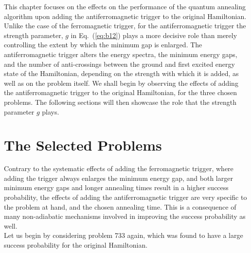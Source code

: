 \documentclass[../main.tex]{subfiles}
\begin{document}
This chapter focuses on the effects on the performance of the quantum annealing algorithm upon adding the antiferromagnetic trigger to the original Hamiltonian. Unlike the case of the ferromagnetic trigger, for the antiferromagnetic trigger the strength parameter, $g$ in Eq.~(\ref{eq:b12}) plays a more decisive role than merely controlling the extent by which the minimum gap is enlarged. The antiferromagnetic trigger alters the energy spectra, the minimum energy gaps, and the number of anti-crossings between the ground and first excited energy state of the Hamiltonian, depending on the strength with which it is added, as well as on the problem itself. We shall begin by observing the effects of adding the antiferromagnetic trigger to the original Hamiltonian, for the three chosen problems. The following sections will then showcase the role that the strength parameter $g$ plays.

\section{The Selected Problems}
Contrary to the systematic effects of adding the ferromagnetic trigger, where adding the trigger always enlarges the minimum energy gap, and both larger minimum energy gaps and longer annealing times result in a higher success probability, the effects of adding the antiferromagnetic trigger are very specific to the problem at hand, and the chosen annealing time. This is a consequence of many non-adiabatic mechanisms involved in improving the success probability as well.\\

Let us begin by considering problem 733 again, which was found to have a large success probability for the original Hamiltonian. \\
\end{document}
